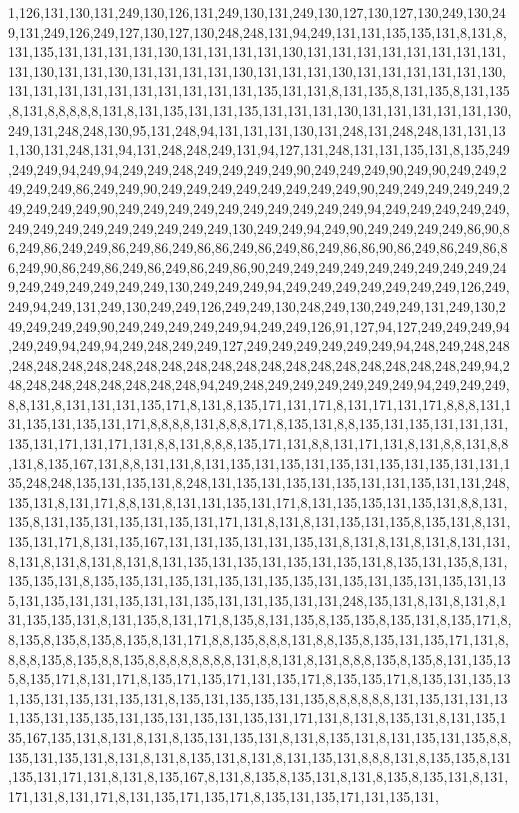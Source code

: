 1,126,131,130,131,249,130,126,131,249,130,131,249,130,127,130,127,130,249,130,249,131,249,126,249,127,130,127,130,248,248,131,94,249,131,131,135,135,131,8,131,8,131,135,131,131,131,131,130,131,131,131,131,130,131,131,131,131,131,131,131,131,131,130,131,131,130,131,131,131,131,130,131,131,131,130,131,131,131,131,131,130,131,131,131,131,131,131,131,131,131,131,135,131,131,8,131,135,8,131,135,8,131,135,8,131,8,8,8,8,8,131,8,131,135,131,131,135,131,131,131,130,131,131,131,131,131,130,249,131,248,248,130,95,131,248,94,131,131,131,130,131,248,131,248,248,131,131,131,130,131,248,131,94,131,248,248,249,131,94,127,131,248,131,131,135,131,8,135,249,249,249,94,249,94,249,249,248,249,249,249,249,90,249,249,249,90,249,90,249,249,249,249,249,86,249,249,90,249,249,249,249,249,249,249,249,90,249,249,249,249,249,249,249,249,249,90,249,249,249,249,249,249,249,249,249,249,94,249,249,249,249,249,249,249,249,249,249,249,249,249,249,130,249,249,94,249,90,249,249,249,249,86,90,86,249,86,249,249,86,249,86,249,86,86,249,86,249,86,249,86,86,90,86,249,86,249,86,86,249,90,86,249,86,249,86,249,86,249,86,90,249,249,249,249,249,249,249,249,249,249,249,249,249,249,249,249,130,249,249,249,94,249,249,249,249,249,249,249,126,249,249,94,249,131,249,130,249,249,126,249,249,130,248,249,130,249,249,131,249,130,249,249,249,249,90,249,249,249,249,249,94,249,249,126,91,127,94,127,249,249,249,94,249,249,94,249,94,249,248,249,249,127,249,249,249,249,249,249,94,248,249,248,248,248,248,248,248,248,248,248,248,248,248,248,248,248,248,248,248,248,248,249,94,248,248,248,248,248,248,248,248,94,249,248,249,249,249,249,249,249,94,249,249,249,8,8,131,8,131,131,131,135,171,8,131,8,135,171,131,171,8,131,171,131,171,8,8,8,131,131,135,131,135,131,171,8,8,8,8,131,8,8,8,171,8,135,131,8,8,135,131,135,131,131,131,135,131,171,131,171,131,8,8,131,8,8,8,135,171,131,8,8,131,171,131,8,131,8,8,131,8,8,131,8,135,167,131,8,8,131,131,8,131,135,131,135,131,135,131,135,131,135,131,131,135,248,248,135,131,135,131,8,248,131,135,131,135,131,135,131,131,135,131,131,248,135,131,8,131,171,8,8,131,8,131,131,135,131,171,8,131,135,135,131,135,131,8,8,131,135,8,131,135,131,135,131,135,131,171,131,8,131,8,131,135,131,135,8,135,131,8,131,135,131,171,8,131,135,167,131,131,135,131,131,135,131,8,131,8,131,8,131,8,131,131,8,131,8,131,8,131,8,131,8,131,135,131,135,131,135,131,135,131,8,135,131,135,8,131,135,135,131,8,135,135,131,135,131,135,131,135,135,131,135,131,135,131,135,131,135,131,135,131,131,135,131,131,135,131,131,135,131,131,248,135,131,8,131,8,131,8,131,135,135,131,8,131,135,8,131,171,8,135,8,131,135,8,135,135,8,135,131,8,135,171,8,8,135,8,135,8,135,8,135,8,131,171,8,8,135,8,8,8,131,8,8,135,8,135,131,135,171,131,8,8,8,8,135,8,135,8,8,135,8,8,8,8,8,8,8,8,131,8,8,131,8,131,8,8,8,135,8,135,8,131,135,135,8,135,171,8,131,171,8,135,171,135,171,131,135,171,8,135,135,171,8,135,131,135,131,135,131,135,131,135,131,8,135,131,135,135,131,135,8,8,8,8,8,8,131,135,131,131,131,135,131,135,135,131,135,131,135,131,135,131,171,131,8,131,8,135,131,8,131,135,135,167,135,131,8,131,8,131,8,135,131,135,131,8,131,8,135,131,8,131,135,131,135,8,8,135,131,135,131,8,131,8,131,8,135,131,8,131,8,131,135,131,8,8,8,131,8,135,135,8,131,135,131,171,131,8,131,8,135,167,8,131,8,135,8,135,131,8,131,8,135,8,135,131,8,131,171,131,8,131,171,8,131,135,171,135,171,8,135,131,135,171,131,135,131,